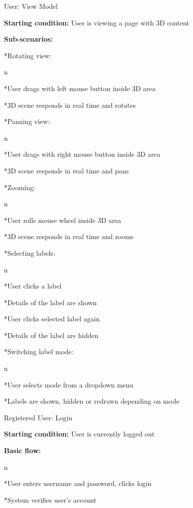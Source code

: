 \enditems

\secc User: View Model

{\bf Starting condition:} User is viewing a page with 3D content

{\bf Sub-scenarios:}

\begitems

*Rotating view:

\begitems \style n

*User drags with left mouse button inside 3D area

*3D scene responds in real time and rotates

\enditems

*Panning view:

\begitems \style n

*User drags with right mouse button inside 3D area

*3D scene responds in real time and pans

\enditems

*Zooming:

\begitems \style n

*User rolls mouse wheel inside 3D area

*3D scene responds in real time and zooms

\enditems

*Selecting labels:

\begitems \style n

*User clicks a label

*Details of the label are shown

*User clicks selected label again

*Details of the label are hidden

\enditems

*Switching label mode:

\begitems \style n

*User selects mode from a dropdown menu

*Labels are shown, hidden or redrawn depending on mode

\enditems

\enditems

\secc Registered User: Login

{\bf Starting condition:} User is currently logged out

{\bf Basic flow:}

\begitems \style n

*User enters username and password, clicks login

*System verifies user’s account

